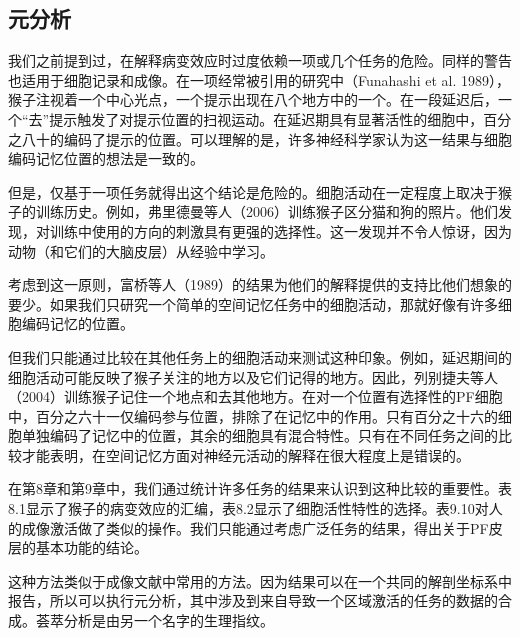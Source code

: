 \subsection{ 元分析}
我们之前提到过，在解释病变效应时过度依赖一项或几个任务的危险。同样的警告也适用于细胞记录和成像。在一项经常被引用的研究中（Funahashi et al. 1989），猴子注视着一个中心光点，一个提示出现在八个地方中的一个。在一段延迟后，一个“去”提示触发了对提示位置的扫视运动。在延迟期具有显著活性的细胞中，百分之八十的编码了提示的位置。可以理解的是，许多神经科学家认为这一结果与细胞编码记忆位置的想法是一致的。
\par
但是，仅基于一项任务就得出这个结论是危险的。细胞活动在一定程度上取决于猴子的训练历史。例如，弗里德曼等人（2006）训练猴子区分猫和狗的照片。他们发现，对训练中使用的方向的刺激具有更强的选择性。这一发现并不令人惊讶，因为动物（和它们的大脑皮层）从经验中学习。
\par
考虑到这一原则，富桥等人（1989）的结果为他们的解释提供的支持比他们想象的要少。如果我们只研究一个简单的空间记忆任务中的细胞活动，那就好像有许多细胞编码记忆的位置。
\par
但我们只能通过比较在其他任务上的细胞活动来测试这种印象。例如，延迟期间的细胞活动可能反映了猴子关注的地方以及它们记得的地方。因此，列别捷夫等人（2004）训练猴子记住一个地点和去其他地方。在对一个位置有选择性的PF细胞中，百分之六十一仅编码参与位置，排除了在记忆中的作用。只有百分之十六的细胞单独编码了记忆中的位置，其余的细胞具有混合特性。只有在不同任务之间的比较才能表明，在空间记忆方面对神经元活动的解释在很大程度上是错误的。
\par
在第8章和第9章中，我们通过统计许多任务的结果来认识到这种比较的重要性。表8.1显示了猴子的病变效应的汇编，表8.2显示了细胞活性特性的选择。表9.10对人的成像激活做了类似的操作。我们只能通过考虑广泛任务的结果，得出关于PF皮层的基本功能的结论。
\par
这种方法类似于成像文献中常用的方法。因为结果可以在一个共同的解剖坐标系中报告，所以可以执行元分析，其中涉及到来自导致一个区域激活的任务的数据的合成。荟萃分析是由另一个名字的生理指纹。
